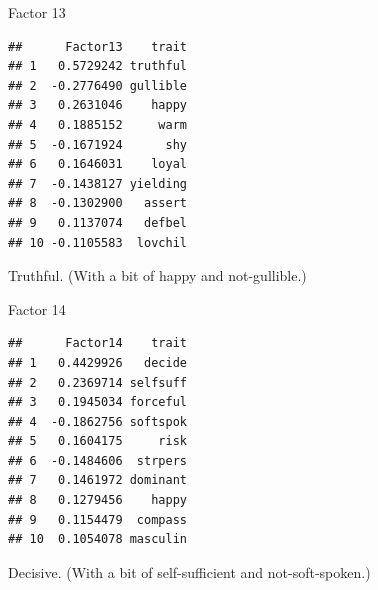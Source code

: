 \documentclass[ignorenonframetext,]{beamer}
\newenvironment{Shaded}{\begin{snugshade}}{\end{snugshade}}
\newcommand{\DecValTok}[1]{\textcolor[rgb]{0.00,0.00,0.81}{#1}}
\newcommand{\KeywordTok}[1]{\textcolor[rgb]{0.13,0.29,0.53}{\textbf{#1}}}
\newcommand{\NormalTok}[1]{#1}
\newcommand{\OperatorTok}[1]{\textcolor[rgb]{0.81,0.36,0.00}{\textbf{#1}}}
\newcommand{\StringTok}[1]{\textcolor[rgb]{0.31,0.60,0.02}{#1}}
\begin{document}
\begin{frame}[fragile]{Factor 13}
\protect\hypertarget{factor-13}{}

\footnotesize

\begin{Shaded}
\end{Shaded}

\begin{verbatim}
##      Factor13    trait
## 1   0.5729242 truthful
## 2  -0.2776490 gullible
## 3   0.2631046    happy
## 4   0.1885152     warm
## 5  -0.1671924      shy
## 6   0.1646031    loyal
## 7  -0.1438127 yielding
## 8  -0.1302900   assert
## 9   0.1137074   defbel
## 10 -0.1105583  lovchil
\end{verbatim}

\normalsize

Truthful. (With a bit of happy and not-gullible.)

\end{frame}

\begin{frame}[fragile]{Factor 14}
\protect\hypertarget{factor-14}{}

\footnotesize

\begin{Shaded}
\end{Shaded}

\begin{verbatim}
##      Factor14    trait
## 1   0.4429926   decide
## 2   0.2369714 selfsuff
## 3   0.1945034 forceful
## 4  -0.1862756 softspok
## 5   0.1604175     risk
## 6  -0.1484606  strpers
## 7   0.1461972 dominant
## 8   0.1279456    happy
## 9   0.1154479  compass
## 10  0.1054078 masculin
\end{verbatim}

\normalsize

Decisive. (With a bit of self-sufficient and not-soft-spoken.)

\end{frame}
\end{document}
